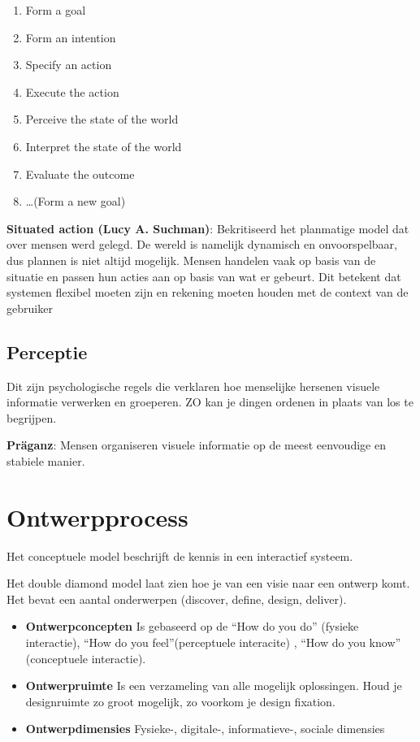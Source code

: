 \documentclass[nonacm, sigconf, balance=true]{acmart}
\begin{document}
    \begin{enumerate}
        \item Form a goal
        \item Form an intention
        \item Specify an action
        \item Execute the action
        \item Perceive the state of the world
        \item Interpret the state of the world
        \item Evaluate the outcome
        \item \ldots(Form a new goal)
    \end{enumerate}

    \textbf{Situated action (Lucy A. Suchman)}: Bekritiseerd het planmatige model dat over mensen werd gelegd.
    De wereld is namelijk dynamisch en onvoorspelbaar, dus plannen is niet altijd mogelijk.
    Mensen handelen vaak op basis van de situatie en passen hun acties aan op basis van wat er gebeurt.
    Dit betekent dat systemen flexibel moeten zijn en rekening moeten houden met de context van de gebruiker

    \subsection{Perceptie}
    Dit zijn psychologische regels die verklaren hoe menselijke hersenen visuele informatie verwerken en groeperen.
    ZO kan je dingen ordenen in plaats van los te begrijpen.

    \textbf{Präganz}: Mensen organiseren visuele informatie op de meest eenvoudige en stabiele manier.


    \section{Ontwerpprocess}
    Het conceptuele model beschrijft de kennis in een interactief systeem.

    Het double diamond model laat zien hoe je van een visie naar een ontwerp komt.
    Het bevat een aantal onderwerpen (discover, define, design, deliver).

    \begin{itemize}
        \item \textbf{Ontwerpconcepten} Is gebaseerd op de ``How do you do'' (fysieke interactie), ``How do you feel''(perceptuele interacite) , ``How do you know'' (conceptuele interactie).
        \item \textbf{Ontwerpruimte} Is een verzameling van alle mogelijk oplossingen.
        Houd je designruimte zo groot mogelijk, zo voorkom je design fixation.
        \item \textbf{Ontwerpdimensies} Fysieke-, digitale-, informatieve-, sociale dimensies
    \end{itemize}
\end{document}
